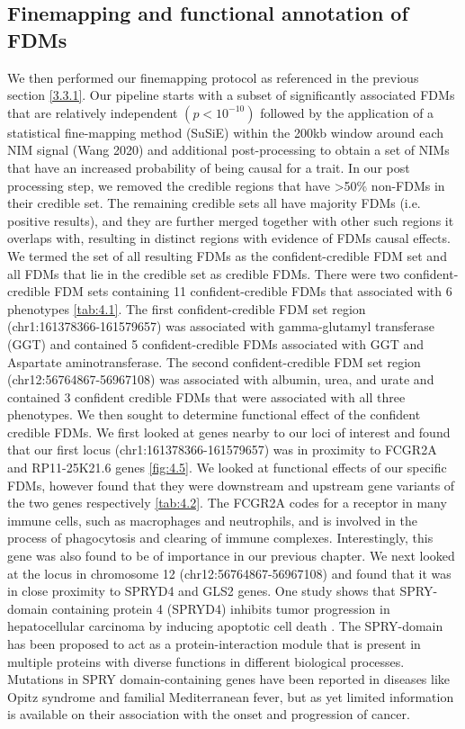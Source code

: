 \subsection{Finemapping and functional annotation of FDMs}
We then performed our finemapping protocol as referenced in the previous section \ref{3.3.1}. Our pipeline starts with a subset of significantly associated FDMs that are relatively independent $(p < 10^{-10})$ followed by the application of a statistical fine-mapping method (SuSiE) within the 200kb window around each NIM signal (Wang 2020) and additional post-processing to obtain a set of NIMs that have an increased probability of being causal for a trait. In our post processing step, we removed the credible regions that have >50\% non-FDMs in their credible set. The remaining credible sets all have majority FDMs (i.e. positive results), and they are further merged together with other such regions it overlaps with, resulting in distinct regions with evidence of FDMs causal effects. We termed the set of all resulting FDMs as the confident-credible FDM set and all FDMs that lie in the credible set as credible FDMs. There were two confident-credible FDM sets containing 11 confident-credible FDMs that associated with 6 phenotypes \ref{tab:4.1}. The first confident-credible FDM set region (chr1:161378366-161579657) was associated with gamma-glutamyl transferase (GGT) and contained 5 confident-credible FDMs associated with GGT and Aspartate aminotransferase. The second confident-credible FDM set region (chr12:56764867-56967108) was associated with albumin, urea, and urate and contained 3 confident credible FDMs that were associated with all three phenotypes. 
We then sought to determine functional effect of the confident credible FDMs. We  first looked at genes nearby to our loci of interest and found that our first locus (chr1:161378366-161579657) was in proximity to FCGR2A and RP11-25K21.6 genes \ref{fig:4.5}. We looked at functional effects of our specific FDMs, however found that they were downstream and upstream gene variants of the two genes respectively \ref{tab:4.2}. The FCGR2A codes for a receptor in many immune cells, such as macrophages and neutrophils, and is involved in the process of phagocytosis and clearing of immune complexes. Interestingly, this gene was also found to be of importance in our previous chapter. 
We next looked at the locus in chromosome 12 (chr12:56764867-56967108) and found that it was in close proximity to SPRYD4 and GLS2 genes. One study shows that SPRY-domain containing protein 4 (SPRYD4) inhibits tumor progression in hepatocellular carcinoma by inducing apoptotic cell death \cite{zahid2019novel}. The SPRY-domain has been proposed to act as a protein-interaction module that is present in multiple proteins with diverse functions in different biological processes. Mutations in SPRY domain-containing genes have been reported in diseases like Opitz syndrome and familial Mediterranean fever, but as yet limited information is available on their association with the onset and progression of cancer. 
